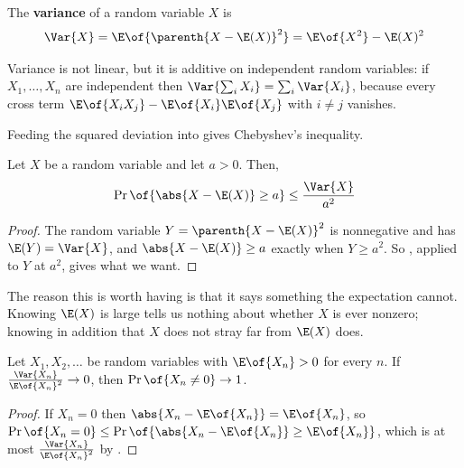 \begin{boxdefinition}[Variance]
    The \textbf{variance} of a random variable $X$ is
    \begin{align*}
        \Var{X} = \E\of{\parenth{X - \E(X)}^2} = \E\of{X^2} - \E(X)^2
    \end{align*}
\end{boxdefinition}

Variance is not linear, but it is additive on independent random variables: if $X_1, \ldots, X_n$ are independent then $\Var{\sum_i X_i} = \sum_i \Var{X_i}$, because every cross term $\E\of{X_i X_j} - \E\of{X_i} \E\of{X_j}$ with $i \neq j$ vanishes.

Feeding the squared deviation into  gives Chebyshev's inequality.

\begin{boxtheorem} \label{Ch3:Thm:Chebyshev}
    Let $X$ be a random variable and let $a > 0$. Then,
    \begin{align*}
        \Pr\of{\abs{X - \E(X)} \geq a} \leq \frac{\Var{X}}{a^2}
    \end{align*}
\end{boxtheorem}
\begin{proof}
    The random variable $Y = \parenth{X - \E(X)}^2$ is nonnegative and has $\E(Y) = \Var{X}$, and $\abs{X - \E(X)} \geq a$ exactly when $Y \geq a^2$. So , applied to $Y$ at $a^2$, gives what we want.
\end{proof}

The reason this is worth having is that it says something the expectation cannot. Knowing $\E(X)$ is large tells us nothing about whether $X$ is ever nonzero; knowing in addition that $X$ does not stray far from $\E(X)$ does.

\begin{boxcorollary} \label{Ch3:Cor:Second_Moment}
    Let $X_1, X_2, \ldots$ be random variables with $\E\of{X_n} > 0$ for every $n$. If $\frac{\Var{X_n}}{\E\of{X_n}^2} \to 0$, then $\Pr\of{X_n \neq 0} \to 1$.
\end{boxcorollary}
\begin{proof}
    If $X_n = 0$ then $\abs{X_n - \E\of{X_n}} = \E\of{X_n}$, so $\Pr\of{X_n = 0} \leq \Pr\of{\abs{X_n - \E\of{X_n}} \geq \E\of{X_n}}$, which is at most $\frac{\Var{X_n}}{\E\of{X_n}^2}$ by .
\end{proof}

